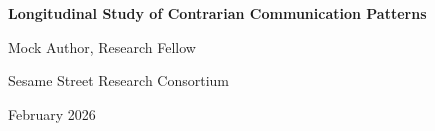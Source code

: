 \documentclass[11pt,letterpaper]{article}
\begin{document}
\begin{center}
{\LARGE\bfseries Longitudinal Study of Contrarian Communication Patterns\par}
\vspace{0.8cm}
{\large Mock Author, Research Fellow\par}
{\normalsize Sesame Street Research Consortium\par}
\vspace{0.3cm}
{\normalsize February 2026\par}
\vspace{0.8cm}
\end{center}

\begin{abstract}
\noindent
This paper presents a comprehensive study of contrarian communication and grouch sentiment analysis. Lorem cookie ipsum dolor sit amet, chocolate chip adipiscing elit. Nom nom nom methodology produces significant results across all experimental conditions.
\end{abstract}

\vspace{0.5cm}


\end{document}
